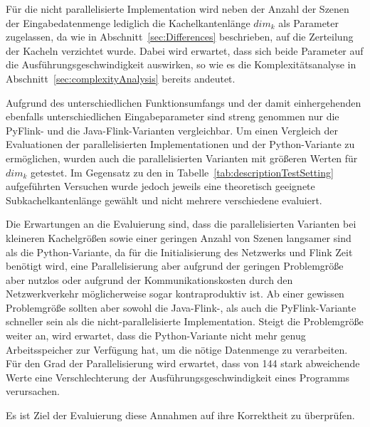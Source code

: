 Für die nicht parallelisierte Implementation wird neben der Anzahl der Szenen der Eingabedatenmenge lediglich die Kachelkantenlänge $dim_k$ als Parameter zugelassen, da wie in Abschnitt~\ref{sec:Differences} beschrieben, auf die Zerteilung der Kacheln verzichtet wurde. Dabei wird erwartet, dass sich beide Parameter auf die Ausführungsgeschwindigkeit auswirken, so wie es die Komplexitätsanalyse in Abschnitt~\ref{sec:complexityAnalysis} bereits andeutet.

Aufgrund des unterschiedlichen Funktionsumfangs und der damit einhergehenden ebenfalls unterschiedlichen Eingabeparameter sind streng genommen nur die PyFlink- und die Java-Flink-Varianten vergleichbar. Um einen Vergleich der Evaluationen der parallelisierten Implementationen und der Python-Variante zu ermöglichen, wurden auch die parallelisierten Varianten mit größeren Werten für $dim_k$ getestet. Im Gegensatz zu den in Tabelle~\ref{tab:descriptionTestSetting} aufgeführten Versuchen wurde jedoch jeweils eine theoretisch geeignete Subkachelkantenlänge gewählt und nicht mehrere verschiedene evaluiert.

Die Erwartungen an die Evaluierung sind, dass die parallelisierten Varianten bei kleineren Kachelgrößen sowie einer geringen Anzahl von Szenen langsamer sind als die Python-Variante, da für die Initialisierung des Netzwerks und Flink Zeit benötigt wird, eine Parallelisierung aber aufgrund der geringen Problemgröße aber nutzlos oder aufgrund der Kommunikationskosten durch den Netzwerkverkehr möglicherweise sogar kontraproduktiv ist. Ab einer gewissen Problemgröße sollten aber sowohl die Java-Flink-, als auch die PyFlink-Variante schneller sein als die nicht-parallelisierte Implementation. Steigt die Problemgröße weiter an, wird erwartet, dass die Python-Variante nicht mehr genug Arbeitsspeicher zur Verfügung hat, um die nötige Datenmenge zu verarbeiten. Für den Grad der Parallelisierung wird erwartet, dass von 144 stark abweichende Werte eine Verschlechterung der Ausführungsgeschwindigkeit eines Programms verursachen.

Es ist Ziel der Evaluierung diese Annahmen auf ihre Korrektheit zu überprüfen.

